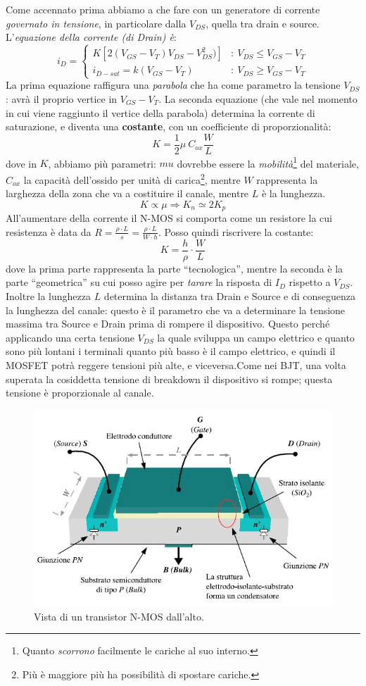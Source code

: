 \documentclass[
]{book}
\begin{document}
Come accennato prima abbiamo a che fare con un generatore di corrente
\emph{governato in tensione}, in particolare dalla \(V_{DS}\), quella
tra drain e source. L'\emph{equazione della corrente (di Drain) è}: \[
i_{D}= \left\{ \begin{array}{cl}
K[2(V_{GS}-V_{T})V_{DS}-V^{2}_{DS})] & : \ V_{DS} \leq V_{GS} - V_{T} \\
i_{D-sat}=k(V_{GS}-V_{T}) & : \ V_{DS} \geq V_{GS} - V_{T}
\end{array} \right.
\] La prima equazione raffigura una \emph{parabola} che ha come
parametro la tensione \(V_{DS}\): avrà il proprio vertice in
\(V_{GS}-V_{T}\). La seconda equazione (che vale nel momento in cui
viene raggiunto il vertice della parabola) determina la corrente di
saturazione, e diventa una \textbf{costante}, con un coefficiente di
proporzionalità: \[
K=\frac{1}{2}\mu\:C_{ox}\frac{W}{L}
\] dove in \(K\), abbiamo più parametri: \(mu\) dovrebbe essere la
\emph{mobilità}\footnote{Quanto \emph{scorrono} facilmente le cariche al
  suo interno.} del materiale, \(C_{ox}\) la capacità dell'ossido per
unità di carica\footnote{Più è maggiore più ha possibilità di spostare
  cariche.}, mentre \(W\) rappresenta la larghezza della zona che va a
costituire il canale, mentre \(L\) è la lunghezza. \[
K\propto \mu \Rightarrow K_{n}\simeq 2K_{p}
\] All'aumentare della corrente il N-MOS si comporta come un resistore
la cui resistenza è data da
\(R=\frac{\rho\cdot L}{s}=\frac{\rho\cdot L}{W\cdot h}\). Posso quindi
riscrivere la costante: \[
K=\frac{h}{\rho}\cdot\frac{W}{L}
\] dove la prima parte rappresenta la parte ``tecnologica'', mentre la
seconda è la parte ``geometrica'' su cui posso agire per \emph{tarare}
la risposta di \(I_D\) rispetto a \(V_{DS}\). Inoltre la lunghezza \(L\)
determina la distanza tra Drain e Source e di conseguenza la lunghezza
del canale: questo è il parametro che va a determinare la tensione
massima tra Source e Drain prima di rompere il dispositivo. Questo
perché applicando una certa tensione \(V_{DS}\) la quale sviluppa un
campo elettrico e quanto sono più lontani i terminali quanto più basso è
il campo elettrico, e quindi il MOSFET potrà reggere tensioni più alte,
e viceversa.\newline Come nei BJT, una volta superata la cosiddetta
tensione di breakdown il dispositivo si rompe; questa tensione è
proporzionale al canale.

\begin{figure}
\centering
\includegraphics[width=0.5\linewidth,height=\textheight,keepaspectratio]{assets/imgs/nmos_dall_alto.png}
\caption{Vista di un transistor N-MOS dall'alto.}
\end{figure}
\end{document}
